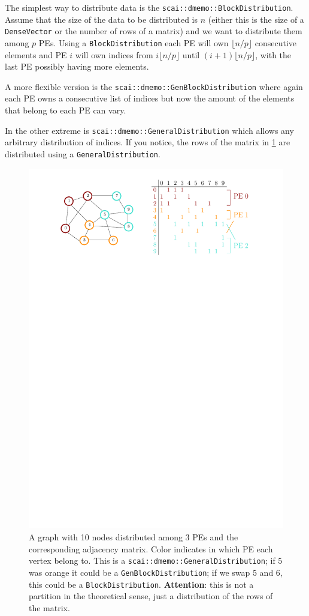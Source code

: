 \documentclass[a4paper,10pt]{article}
\newcommand{\att}{\textbf{Attention}: }
\newcommand{\MI}[1]{\texttt{#1}}
\begin{document}
The simplest way to distribute data
is the \MI{scai::dmemo::BlockDistribution}. Assume that the size of the data to be 
distributed is $n$
(either this is the size of a \MI{DenseVector} or the number of rows of a matrix) and we want
to distribute them among $p$ PEs. Using a \MI{BlockDistribution} each PE will 
own $\lfloor n/p \rfloor$
consecutive elements and PE $i$ will own indices from $i\lfloor n/p \rfloor$ 
until $(i+1)\lfloor n/p \rfloor$, with the last PE possibly having more elements.

A more flexible version is the \MI{scai::dmemo::GenBlockDistribution} where again each PE owns a 
consecutive list of indices but now the amount of the elements that belong to each PE can vary.

In the other extreme is \MI{scai::dmemo::GeneralDistribution} which allows any 
arbitrary distribution of indices. 
If you notice, the rows of the matrix in \cref{fig:graph} are distributed using a
\MI{GeneralDistribution}. 

\begin{figure}[h]
\centering
\includegraphics[scale=0.8]{graph}
\caption{A graph with 10 nodes distributed among 3 PEs and the corresponding adjacency 
matrix. Color indicates in which PE each vertex belong to. This is a \MI{scai::dmemo::GeneralDistribution}; if 5 was orange it could be a
\MI{GenBlockDistribution}; if we swap 5 and 6, this could be a \MI{BlockDistribution}.
\att this is not a partition in the theoretical sense, just a distribution of
the rows of the matrix.}
\label{fig:graph}
\end{figure}
\end{document}

